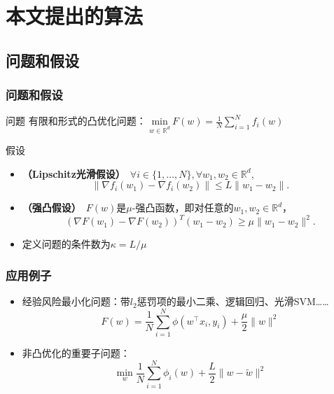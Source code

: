\section{本文提出的算法}

\subsection{问题和假设}
\frame
{
\frametitle{问题和假设}
\begin{block}{问题}
有限和形式的凸优化问题：
$\underset{w \in \mathbb{R}^d}{\text{min}}\ F(w) = \frac{1}{N}\sum_{i=1}^{N} f_i(w)$
\end{block}

\pause

\begin{block}{假设}
\begin{itemize}
    \item \textbf{（Lipschitz光滑假设）}\
    $\forall i \in \{1, \ldots, N\}, \forall w_1, w_2 \in \mathbb{R}^d$,
    $$
    \| \nabla f_i(w_1) - \nabla f_i(w_2) \| \le L \| w_1 - w_2 \|.
    $$

    \item \textbf{（强凸假设）}\
	$F(w)$是$\mu$-强凸函数，即对任意的$w_1, w_2 \in \mathbb{R}^d$，
    $$
	    (\nabla F(w_1) - \nabla F(w_2))^T(w_1 - w_2) \ge \mu \| w_1 - w_2 \|^2.
    $$

    \item 定义问题的条件数为$\kappa = L / \mu$

\end{itemize}
\end{block}
}

\frame
{
\frametitle{应用例子}
\begin{itemize}
    \item 经验风险最小化问题：带$l_2$惩罚项的最小二乘、逻辑回归、光滑SVM……
    $$
        F(w) = \frac{1}{N}\sum_{i=1}^N\phi(w^\top x_i, y_i) + \frac{\mu}{2}\|w\|^2
    $$
    \item 非凸优化的重要子问题：
    $$
	\min_{w} \frac{1}{N}\sum_{i=1}^{N}\phi_i(w) + \frac{L}{2}\|w - \tilde{w}\|^2
    $$

\end{itemize}
}

